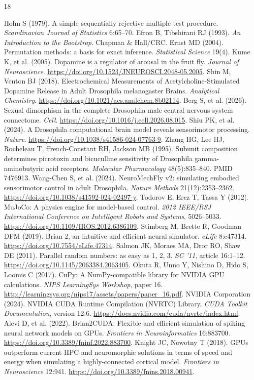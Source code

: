 \documentclass[11pt]{article}
\begin{document}
\begin{thebibliography}{18}\small\raggedright
{} Holm S (1979). A simple sequentially rejective multiple test procedure. \textit{Scandinavian Journal of Statistics} 6:65--70.
 Efron B, Tibshirani RJ (1993). \textit{An Introduction to the Bootstrap}. Chapman \& Hall/CRC.
 Ernst MD (2004). Permutation methods: a basis for exact inference. \textit{Statistical Science} 19(4).
 Kume K, et al. (2005). Dopamine is a regulator of arousal in the fruit fly. \textit{Journal of Neuroscience}. \url{https://doi.org/10.1523/JNEUROSCI.2048-05.2005}.
 Shin M, Venton BJ (2018). Electrochemical Measurements of Acetylcholine-Stimulated Dopamine Release in Adult Drosophila melanogaster Brains. \textit{Analytical Chemistry}. \url{https://doi.org/10.1021/acs.analchem.8b02114}.
 Berg S, et al. (2026). Sexual dimorphism in the complete Drosophila male central nervous system connectome. \textit{Cell}. \url{https://doi.org/10.1016/j.cell.2026.08.015}.
 Shiu PK, et al. (2024). A Drosophila computational brain model reveals sensorimotor processing. \textit{Nature}. \url{https://doi.org/10.1038/s41586-024-07763-9}.
 Zhang HG, Lee HJ, Rocheleau T, ffrench-Constant RH, Jackson MB (1995). Subunit composition determines picrotoxin and bicuculline sensitivity of Drosophila gamma-aminobutyric acid receptors. \textit{Molecular Pharmacology} 48(5):835--840. PMID 7476913.
 Wang-Chen S, et al. (2024). NeuroMechFly v2: simulating embodied sensorimotor control in adult Drosophila. \textit{Nature Methods} 21(12):2353--2362. \url{https://doi.org/10.1038/s41592-024-02497-y}.
 Todorov E, Erez T, Tassa Y (2012). MuJoCo: A physics engine for model-based control. \textit{2012 IEEE/RSJ International Conference on Intelligent Robots and Systems}, 5026--5033. \url{https://doi.org/10.1109/IROS.2012.6386109}.
 Stimberg M, Brette R, Goodman DFM (2019). Brian 2, an intuitive and efficient neural simulator. \textit{eLife} 8:e47314. \url{https://doi.org/10.7554/eLife.47314}.
 Salmon JK, Moraes MA, Dror RO, Shaw DE (2011). Parallel random numbers: as easy as 1, 2, 3. \textit{SC '11}, article 16:1--12. \url{https://doi.org/10.1145/2063384.2063405}.
 Okuta R, Unno Y, Nishino D, Hido S, Loomis C (2017). CuPy: A NumPy-compatible library for NVIDIA GPU calculations. \textit{NIPS LearningSys Workshop}, paper 16. \url{http://learningsys.org/nips17/assets/papers/paper_16.pdf}.
 NVIDIA Corporation (2024). NVIDIA CUDA Runtime Compilation (NVRTC) Library. \textit{CUDA Toolkit Documentation}, version 12.6. \url{https://docs.nvidia.com/cuda/nvrtc/index.html}.
 Alevi D, et al. (2022). Brian2CUDA: Flexible and efficient simulation of spiking neural network models on GPUs. \textit{Frontiers in Neuroinformatics} 16:883700. \url{https://doi.org/10.3389/fninf.2022.883700}.
 Knight JC, Nowotny T (2018). GPUs outperform current HPC and neuromorphic solutions in terms of speed and energy when simulating a highly-connected cortical model. \textit{Frontiers in Neuroscience} 12:941. \url{https://doi.org/10.3389/fnins.2018.00941}.
\end{thebibliography}
\end{document}
